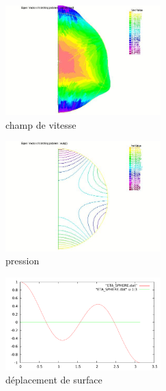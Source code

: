 \documentclass[a4paper]{report}
\begin{document}

\begin{figure}[h!] 
\begin{center}
\includegraphics[width=6cm]{2_3_1_champ_de_vitesse.jpeg}
\caption{champ de vitesse}
\end{center}
\end{figure}


\begin{figure}[h!] 
\begin{center}
\includegraphics[width=6cm]{2_3_1_pression.jpeg}
\caption{pression}
\end{center}
\end{figure}


\begin{figure}[h!] 
\begin{center}
\includegraphics[width=6cm]{2_3_1_ETA_SPHERE.pdf}
\caption{déplacement de surface}
\end{center}
\end{figure}
\end{document}

